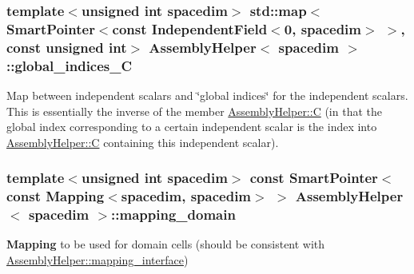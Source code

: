 \subsubsection[{\texorpdfstring{global\+\_\+indices\+\_\+C}{global_indices_C}}]{\setlength{\rightskip}{0pt plus 5cm}template$<$unsigned int spacedim$>$ std\+::map$<${\bf Smart\+Pointer}$<$const {\bf Independent\+Field}$<$0, spacedim$>$ $>$, const unsigned int$>$ {\bf Assembly\+Helper}$<$ spacedim $>$\+::global\+\_\+indices\+\_\+C\hspace{0.3cm}{\ttfamily [private]}}\hypertarget{class_assembly_helper_a9a8f0e8ea8c67ce9429c16a2017cafdc}{}\label{class_assembly_helper_a9a8f0e8ea8c67ce9429c16a2017cafdc}
Map between independent scalars and \char`\"{}global indices\char`\"{} for the independent scalars. This is essentially the inverse of the member \hyperlink{class_assembly_helper_aa5234a46be82cfe7d92678169d38f326}{Assembly\+Helper\+::C} (in that the global index corresponding to a certain independent scalar is the index into \hyperlink{class_assembly_helper_aa5234a46be82cfe7d92678169d38f326}{Assembly\+Helper\+::C} containing this independent scalar). 
\subsubsection[{\texorpdfstring{mapping\+\_\+domain}{mapping_domain}}]{\setlength{\rightskip}{0pt plus 5cm}template$<$unsigned int spacedim$>$ const {\bf Smart\+Pointer}$<$const {\bf Mapping}$<$spacedim, spacedim$>$ $>$ {\bf Assembly\+Helper}$<$ spacedim $>$\+::mapping\+\_\+domain\hspace{0.3cm}{\ttfamily [private]}}\hypertarget{class_assembly_helper_a3fbb49461000dea8f64266f830709fad}{}\label{class_assembly_helper_a3fbb49461000dea8f64266f830709fad}
{\bf Mapping} to be used for domain cells (should be consistent with \hyperlink{class_assembly_helper_a055fde6217c18e62cd80188d0130c201}{Assembly\+Helper\+::mapping\+\_\+interface}) 
